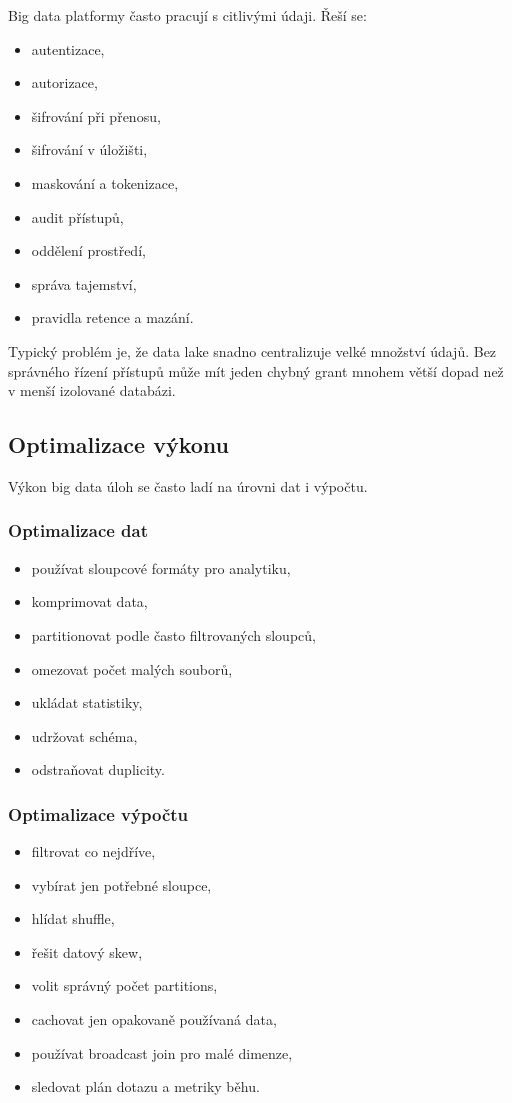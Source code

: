 Big data platformy často pracují s citlivými údaji. Řeší se:
\begin{itemize}
    \item autentizace,
    \item autorizace,
    \item šifrování při přenosu,
    \item šifrování v úložišti,
    \item maskování a tokenizace,
    \item audit přístupů,
    \item oddělení prostředí,
    \item správa tajemství,
    \item pravidla retence a mazání.
\end{itemize}

Typický problém je, že data lake snadno centralizuje velké množství údajů. Bez správného řízení přístupů
může mít jeden chybný grant mnohem větší dopad než v menší izolované databázi.

\subsection{Optimalizace výkonu}

Výkon big data úloh se často ladí na úrovni dat i výpočtu.

\subsubsection{Optimalizace dat}

\begin{itemize}
    \item používat sloupcové formáty pro analytiku,
    \item komprimovat data,
    \item partitionovat podle často filtrovaných sloupců,
    \item omezovat počet malých souborů,
    \item ukládat statistiky,
    \item udržovat schéma,
    \item odstraňovat duplicity.
\end{itemize}

\subsubsection{Optimalizace výpočtu}

\begin{itemize}
    \item filtrovat co nejdříve,
    \item vybírat jen potřebné sloupce,
    \item hlídat shuffle,
    \item řešit datový skew,
    \item volit správný počet partitions,
    \item cachovat jen opakovaně používaná data,
    \item používat broadcast join pro malé dimenze,
    \item sledovat plán dotazu a metriky běhu.
\end{itemize}

